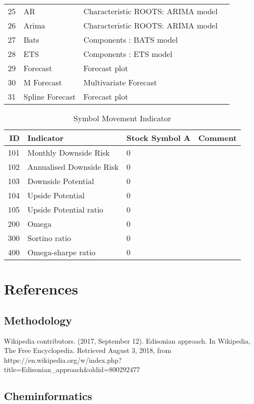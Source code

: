 \begin{table}
\begin{tabular}{r|p{4cm}|ll}
		\hline
		25 & AR	 & Characteristic ROOTS: ARIMA model  & \\
		26 & Arima & Characteristic ROOTS: ARIMA model  & \\
		27 & Bats & Components : BATS model  & \\
		28 & ETS & Components : ETS model  & \\
		29 & Forecast & Forecast plot  & \\
		30 & M Forecast & Multivariate Forecast  & \\
		31 & Spline Forecast & 	Forecast plot  & \\
		\hline
	\end{tabular}
\end{table}


\begin{table}[ht]
	\caption{Symbol Movement Indicator \cite{key100}}
	\begin{tabular}{rlll}
		\hline
		ID & Indicator & Stock Symbol A & Comment \\
		\hline
		101 & Monthly Downside Risk & 0 & \\ 
		102 & Annualised Downside Risk & 0 & \\ 
		103 & Downside Potential & 0 & \\ 
		104 & Upside Potential & 0 & \\ 
		105 & Upside Potential ratio & 0 & \\ 
		200 & Omega & 0 &  \\ 
		300 & Sortino ratio & 0 & \\ 
		400 & Omega-sharpe ratio & 0 & \\ 
		\hline
	\end{tabular}
\end{table}


\section{References}

\subsection{Methodology}

Wikipedia contributors. (2017, September 12). 
\newblock Edisonian approach. 
\newblock In Wikipedia, The Free Encyclopedia. Retrieved August 3, 2018, from  https://en.wikipedia.org/w/index.php?title=Edisonian_approach&oldid=800292477

\subsection{Cheminformatics}

